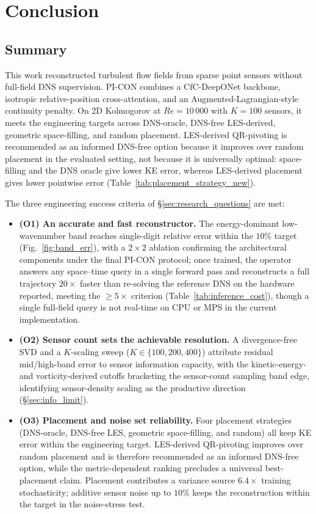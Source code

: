 \chapter{Conclusion}
\label{ch:discussion_conclusion}

\section{Summary}
\label{sec:summary}

This work reconstructed turbulent flow fields from sparse point sensors without full-field DNS supervision. PI-CON combines a CfC-DeepONet backbone, isotropic relative-position cross-attention, and an Augmented-Lagrangian-style continuity penalty. On 2D Kolmogorov at $Re=10\,000$ with $K=100$ sensors, it meets the engineering targets across DNS-oracle, DNS-free LES-derived, geometric space-filling, and random placement. LES-derived QR-pivoting is recommended as an informed DNS-free option because it improves over random placement in the evaluated setting, not because it is universally optimal: space-filling and the DNS oracle give lower KE error, whereas LES-derived placement gives lower pointwise error (Table~\ref{tab:placement_strategy_new}).

The three engineering success criteria of \S\ref{sec:research_questions} are met:
\begin{itemize}
    \item \textbf{(O1) An accurate and fast reconstructor.} The energy-dominant low-wavenumber band reaches single-digit relative error within the $10\%$ target (Fig.~\ref{fig:band_err}), with a $2\times2$ ablation confirming the architectural components under the final PI-CON protocol; once trained, the operator answers any space--time query in a single forward pass and reconstructs a full trajectory $20\times$ faster than re-solving the reference DNS on the hardware reported, meeting the $\ge 5\times$ criterion (Table~\ref{tab:inference_cost}), though a single full-field query is not real-time on CPU or MPS in the current implementation.
    \item \textbf{(O2) Sensor count sets the achievable resolution.} A divergence-free SVD and a $K$-scaling sweep ($K\in\{100,200,400\}$) attribute residual mid/high-band error to sensor information capacity, with the kinetic-energy- and vorticity-derived cutoffs bracketing the sensor-count sampling band edge, identifying sensor-density scaling as the productive direction (\S\ref{sec:info_limit}).
    \item \textbf{(O3) Placement and noise set reliability.} Four placement strategies (DNS-oracle, DNS-free LES, geometric space-filling, and random) all keep KE error within the engineering target. LES-derived QR-pivoting improves over random placement and is therefore recommended as an informed DNS-free option, while the metric-dependent ranking precludes a universal best-placement claim. Placement contributes a variance source $6.4\times$ training stochasticity; additive sensor noise up to $10\%$ keeps the reconstruction within the target in the noise-stress test.
\end{itemize}

